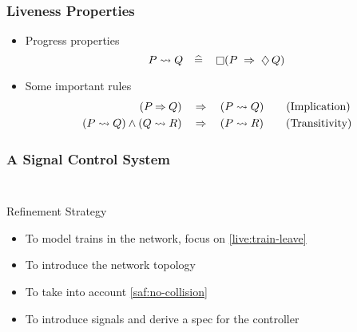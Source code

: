 \begin{frame}
  \frametitle{Liveness Properties}

  \begin{itemize}
  \item \alert{Progress} properties
    \[P \leadsto Q  ~~~\widehat{=}~~~ \mathop{\square} (P ~\mathbin\Rightarrow~ \mathop{\diamondsuit} Q)\]
  \item Some important rules
  \begin{align}
    (P \mathbin\Rightarrow Q) ~~~&\mathbin\Rightarrow~~~ (P \leadsto Q)
    \tag{Implication}\label{eq:implication} \\
    (P \leadsto Q) \land (Q \leadsto R) ~~~&\mathbin\Rightarrow~~~ (P \leadsto R)
    \tag{Transitivity}\label{eq:transitivity}
  \end{align}
  \end{itemize}
\end{frame}

\begin{frame}
  \frametitle{A Signal Control System}

  \begin{columns}
    \begin{column}{0.55\textwidth}
      \begin{figure}
        \centering
        
      \end{figure}
    \end{column}
    \hspace{-2em}
    \begin{column}{0.6\textwidth}
      \begin{requirements}
        \ReqSpacing
      \end{requirements}
    \end{column}
  \end{columns}
  \medskip

  \pause

  \begin{block}{Refinement Strategy}
    \begin{itemize}
    \item[Model 0] To model trains in the network, focus on \ref{live:train-leave}
    \item[Ref. 1] To introduce the network topology
    \item[Ref. 2] To take into account \ref{saf:no-collision}
    \item[Ref. 3] To introduce signals and derive a spec for the controller
    \end{itemize}
  \end{block}
\end{frame}


